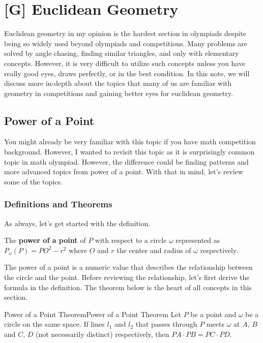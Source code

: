 \documentclass[../../main.tex]{subfiles}
\begin{document}
\chapter{[G] Euclidean Geometry}

Euclidean geometry in my opinion is the hardest section in
olympiads despite being so widely used beyond olympiads and
competitions. Many problems are solved by angle chasing, finding
similar triangles, and only with elementary concepts. However,
it is very difficult to utilize such concepts unless you have
really good eyes, draws perfectly, or in the best condition.
In this note, we will discuss more in-depth about the topics that
many of us are familiar with geometry in competitions and gaining
better eyes for euclidean geometry.

\section{Power of a Point}

You might already be very familiar with this topic if you have
math competition background. However, I wanted to revisit this
topic as it is surprisingly common topic in math olympiad.
However, the difference could be finding patterns and more
advanced topics from power of a point. With that in mind,
let's review some of the topics.

\subsection{Definitions and Theorems}

As always, let's get started with the definition.

\begin{definition}{}{}
The \textbf{power of a point} of $P$ with respect to a circle
$\omega$ represented as $P_\omega(P) = PO^2 - r^2$ where $O$
and $r$ the center and radius of $\omega$ respectively.
\end{definition}

The power of a point is a numeric value that describes the
relationship between the circle and the point. Before reviewing
the relationship, let's first derive the formula in the definition.
The theorem below is the heart of all concepts in this section.

\begin{theorem}{Power of a Point Theorem}{Power of a Point Theorem}
Let $P$ be a point and $\omega$ be a circle on the same space.
If lines $l_1$ and $l_2$ that passes through $P$ meets $\omega$
at $A$, $B$ and $C$, $D$ (not necessarily distinct) respectively,
then $PA \cdot PB = PC \cdot PD$.
\end{theorem}
\end{document}

